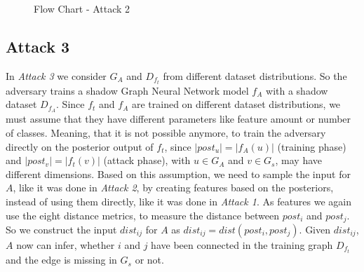       \vspace{0.48cm}
      \begin{figure}[h!]
        \caption{Flow Chart - Attack 2}
        \label{figure:flow-chart-attack-2}
      \end{figure}

      \subsection*{Attack 3}
      \label{section:attack3}
        In \emph{Attack 3} we consider $G_A$ and $D_{f_t}$ from different dataset distributions.
        So the adversary trains a shadow Graph Neural Network model $f_A$ with a shadow dataset $D_{f_A}$.
        Since $f_t$ and $f_A$ are trained on different dataset distributions, we must assume that they have different parameters like feature amount or number of classes. 
        Meaning, that it is not possible anymore, to train the adversary directly on the posterior output of $f_t$, since $|post_u| = |f_A(u)|$ (training phase) and $|post_v| = |f_t(v)|$ (attack phase), with $u \in G_A$ and $v \in G_s$, may have different dimensions.
        Based on this assumption, we need to sample the input for $A$, like it was done in \emph{Attack 2}, by creating features based on the posteriors, instead of using them directly, like it was done in \emph{Attack 1}.
        As features we again use the eight distance metrics, to measure the distance between $post_i$ and $post_j$.
        So we construct the input $dist_{ij}$ for $A$ as $dist_{ij} = dist(post_i, post_j)$.
        Given $dist_{ij}$, $A$ now can infer, whether $i$ and $j$ have been connected in the training graph $D_{f_t}$ and the edge is missing in $G_s$ or not.
  
